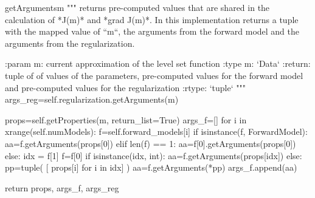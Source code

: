 \begin{methoddesc}[InversionCostFunction]{getArguments}{m}
        """
        returns pre-computed values that are shared in the calculation of
        *J(m)* and *grad J(m)*. In this implementation returns a tuple with the
        mapped value of ``m``, the arguments from the forward model and the
        arguments from the regularization.
        
        :param m: current approximation of the level set function
        :type m: `Data`
        :return: tuple of of values of the parameters, pre-computed values for the forward model and
                 pre-computed values for the regularization
        :rtype: `tuple`
        """
        args_reg=self.regularization.getArguments(m)

        props=self.getProperties(m, return_list=True)
        args_f=[]
        for i in xrange(self.numModels):
           f=self.forward_models[i]
           if isinstance(f, ForwardModel): 
              aa=f.getArguments(props[0])
           elif len(f) == 1:
              aa=f[0].getArguments(props[0])
           else:
              idx = f[1]
              f=f[0]
              if isinstance(idx, int):
                 aa=f.getArguments(props[idx])
              else:
                 pp=tuple( [ props[i] for i in idx] )
                 aa=f.getArguments(*pp)
           args_f.append(aa)
           
        return props, args_f, args_reg
\end{methoddesc}


